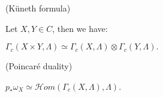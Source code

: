 \begin{definition}
\begin{proposition} (Küneth formula)

    Let $X,Y \in C$, then we have:

$    \Gamma_c(X \times Y, \Lambda) \simeq \Gamma_c(X, \Lambda) \otimes \Gamma_c(Y, \Lambda) .$
    
\end{proposition}

\begin{proposition}(Poincaré duality)

 $p_*\omega_X\simeq \mathcal{H}om(\Gamma_c(X,\Lambda),\Lambda)$.
    
\end{proposition}

\end{definition}